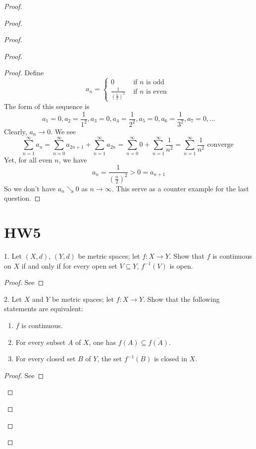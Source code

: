 \documentclass{report}
\begin{document}
\begin{proof}
\begin{proof}
\begin{proof}
\begin{proof}
\begin{proof}
Define
\begin{equation}
a_n=\begin{cases}
 0& \text{ if $n$ is odd }\\
 \frac{1}{(\frac{n}{2})^2}& \text{ if $n$ is even }
\end{cases}
\end{equation}
The form of this sequence is
\begin{equation}
a_1=0,a_2=\frac{1}{1^2},a_3=0,a_4=\frac{1}{2^2},a_5=0,a_6=\frac{1}{3^2},a_7=0,\dots 
\end{equation}
Clearly, $a_n\to 0$. We see
\begin{equation}
\sum_{n=1}^\infty a_n=\sum_{n=0}^\infty a_{2n+1}+\sum_{n=1}^\infty a_{2n}=\sum_{n=0}^\infty 0+\sum_{n=1}^\infty \frac{1}{n^2}=\sum_{n=1}^\infty \frac{1}{n^2}\text{ converge }
\end{equation}
Yet, for all even  $n$, we have
 \begin{equation}
a_n=\frac{1}{(\frac{n}{2})^2}>0=a_{n+1}
\end{equation}
So we don't have $a_n\searrow 0$ as  $n\to\infty$. This serve as a counter example for the last question.
\end{proof}
\section{HW5}

\begin{question}{}{}
1. Let \((X, d)\), \((Y, d)\) be metric spaces; let \(f : X \rightarrow Y\). Show that \(f\) is continuous on \(X\) if and
only if for every open set \(V\subseteq Y\), \(f^{-1}(V)\) is open.
\end{question}
\begin{proof}
See 
\end{proof}

\begin{question}{}{}

2. Let \(X\) and \(Y\) be metric spaces; let \(f : X \rightarrow Y\). Show that the following statements are
equivalent:

\begin{enumerate}
    \item \(f\) is continuous.
    \item For every subset \(A\) of \(X\), one has \(f(A) \subseteq \overline{f(A)}\).
    \item For every closed set \(B\) of \(Y\), the set \(f^{-1}(B)\) is closed in \(X\).
\end{enumerate}
\end{question}
\begin{proof}
See 
\end{proof}


\end{proof}
\end{proof}
\end{proof}
\end{proof}
\end{document}
